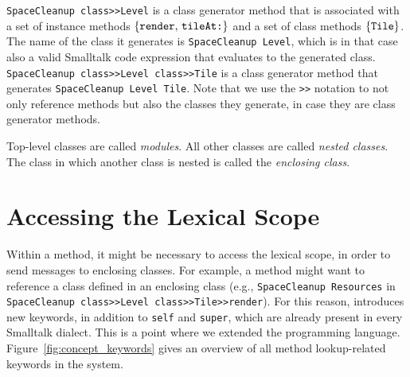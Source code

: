 \texttt{SpaceCleanup class>>Level} is a class generator method that is associated with a set of instance methods $\{\mbox{\texttt{render}, \texttt{tileAt:}}\}$ and a set of class methods $\{\mbox{\texttt{Tile}}\}$. The name of the class it generates is \texttt{SpaceCleanup Level}, which is in that case also a valid Smalltalk code expression that evaluates to the generated class. \texttt{SpaceCleanup class>>Level class>>Tile} is a class generator method that generates \texttt{SpaceCleanup Level Tile}. Note that we use the \texttt{>>} notation to not only reference methods but also the classes they generate, in case they are class generator methods.

Top-level classes are called \emph{modules}. All other classes are called \emph{nested classes}. The class in which another class is nested is called the \emph{enclosing class}.


\section{Accessing the Lexical Scope}
Within a method, it might be necessary to access the lexical scope, in order to send messages to enclosing classes. For example, a method might want to reference a class defined in an enclosing class (e.g., \texttt{SpaceCleanup Resources} in \texttt{SpaceCleanup class>>Level class>>Tile>>render}). For this reason, \msname introduces new keywords, in addition to \texttt{self} and \texttt{super}, which are already present in every Smalltalk dialect. This is a point where we extended the programming language. Figure~\ref{fig:concept_keywords} gives an overview of all method lookup-related keywords in the system.

